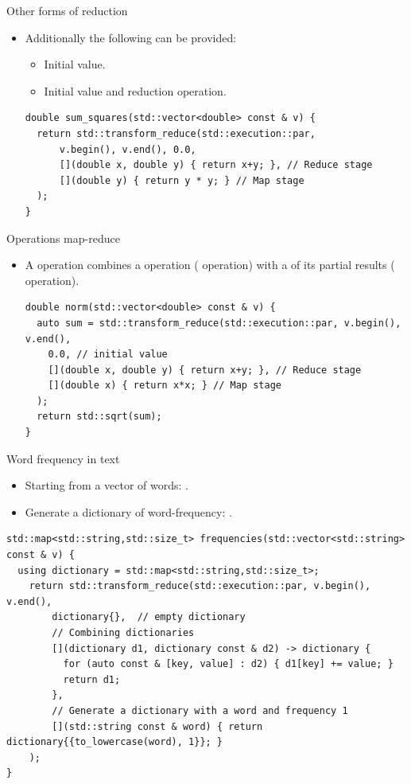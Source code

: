 \begin{frame}[t,fragile]{Other forms of reduction}
\begin{itemize}
  \item Additionally the following can be provided:
    \begin{itemize}
      \item Initial value.
      \item Initial value and reduction operation.
    \end{itemize}
\begin{lstlisting}
double sum_squares(std::vector<double> const & v) {
  return std::transform_reduce(std::execution::par,
      v.begin(), v.end(), 0.0, 
      [](double x, double y) { return x+y; }, // Reduce stage
      [](double y) { return y * y; } // Map stage
  );
}
\end{lstlisting}

\end{itemize}
\end{frame}

\begin{frame}[t,fragile]{Operations map-reduce}
\begin{itemize}
  \item A  operation combines a
         operation ( operation) 
        with a  of its partial results
        ( operation).
\begin{lstlisting}
double norm(std::vector<double> const & v) {
  auto sum = std::transform_reduce(std::execution::par, v.begin(), v.end(),
    0.0, // initial value
    [](double x, double y) { return x+y; }, // Reduce stage
    [](double x) { return x*x; } // Map stage
  );
  return std::sqrt(sum);
}
\end{lstlisting}
\end{itemize}
\end{frame}

\begin{frame}[t,fragile]{Word frequency in text}
\begin{itemize}
  \item Starting from a vector of words: .
  \item Generate a dictionary of word-frequency:
.
\end{itemize}
\begin{lstlisting}
std::map<std::string,std::size_t> frequencies(std::vector<std::string> const & v) {
  using dictionary = std::map<std::string,std::size_t>;
    return std::transform_reduce(std::execution::par, v.begin(), v.end(), 
        dictionary{},  // empty dictionary
        // Combining dictionaries
        [](dictionary d1, dictionary const & d2) -> dictionary {
          for (auto const & [key, value] : d2) { d1[key] += value; }
          return d1;
        },
        // Generate a dictionary with a word and frequency 1
        [](std::string const & word) { return dictionary{{to_lowercase(word), 1}}; }
    );
}
\end{lstlisting}
\end{frame}
